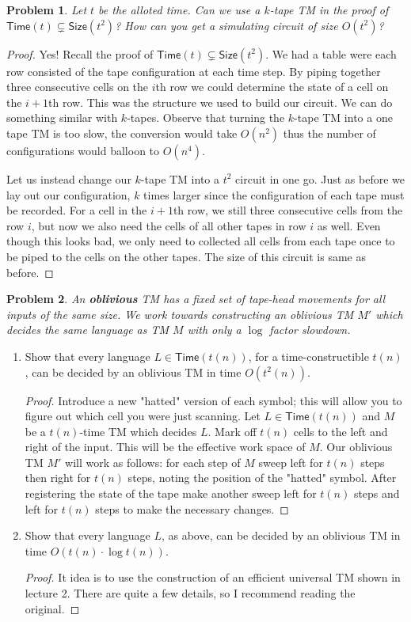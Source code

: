 \documentclass[11pt]{article}
\def\Time{\mathsf{Time}}
\def\Size{\mathsf{Size}}
\newtheorem{problem}{Problem}
\begin{document}
\begin{problem}
Let $t$ be the alloted time. Can we use a $k$-tape TM in the proof of $\Time(t) \subsetneq \Size(t^2)$? How can you get a simulating circuit of size $O(t^2)$?
\end{problem}
\begin{proof}
Yes! Recall the proof of $\Time(t) \subsetneq \Size(t^2)$. We had a table were each row consisted of the tape configuration at each time step. By piping together three consecutive cells on the $i$th row we could determine the state of a cell on the $i+1$th row. This was the structure we used to build our circuit. We can do something similar with $k$-tapes. Observe that turning the $k$-tape TM into a one tape TM is too slow, the conversion would take $O(n^2)$ thus the number of configurations would balloon to $O(n^4)$. 

Let us instead change our $k$-tape TM into a $t^2$ circuit in one go. Just as before we lay out our configuration, $k$ times larger since the configuration of each tape must be recorded. For a cell in the $i+1$th row, we still three consecutive cells from the row $i$, but now we also need the cells of all other tapes in row $i$ as well. Even though this looks bad, we only need to collected all cells from each tape once to be piped to the cells on the other tapes. The size of this circuit is same as before.  
\end{proof}


\begin{problem}
An \textbf{oblivious} TM has a fixed set of tape-head movements for all inputs of the same size. We work towards constructing an oblivious TM $M'$ which decides the same language as TM $M$ with only a $\log$ factor slowdown. 
\end{problem}
\begin{enumerate}
\item Show that every language $L \in \Time(t(n))$, for a time-constructible $t(n)$, can be decided by an oblivious TM in time $O(t^2(n))$.
\begin{proof}
Introduce a new "hatted" version of each symbol; this will allow you to figure out which cell you were just scanning. Let $L \in \Time(t(n))$ and $M$ be a $t(n)$-time TM which decides $L$. Mark off $t(n)$ cells to the left and right of the input. This will be the effective work space of $M$. Our oblivious TM $M'$ will work as follows: for each step of $M$ sweep left for $t(n)$ steps then right for $t(n)$ steps, noting the position of the "hatted" symbol. After registering the state of the tape make another sweep left for $t(n)$ steps and left for $t(n)$ steps to make the necessary changes. 
\end{proof}
\item Show that every language $L$, as above, can be decided by an oblivious TM in time $O(t(n) \cdot \log t(n))$. 
\begin{proof}
It idea is to use the construction of an efficient universal TM shown in lecture 2. There are quite a few details, so I recommend reading the original. 
\end{proof}
\end{enumerate}
\end{document}

